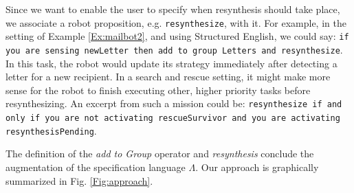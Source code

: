 Since we want to enable the user to specify when resynthesis should take place,
we associate a robot proposition, e.g. \texttt{resynthesize}, with it. 
For example, in the setting of Example \ref{Ex:mailbot2}, and using Structured English, we could say:
\texttt{if you are sensing newLetter then add to group Letters and resynthesize}. 
In this task, the robot would update its strategy immediately after detecting a letter for a new recipient. In a search and rescue setting, it might make more sense for the robot to finish executing other, higher priority tasks before resynthesizing. An excerpt from such a mission could be: \texttt{resynthesize if and only if you are not activating rescueSurvivor and you are activating resynthesisPending}.
%
%	
%	

The definition of the \emph{add to Group} operator and \emph{resynthesis} conclude the augmentation of the specification language $\Lambda$. Our approach is graphically summarized in Fig. \ref{Fig:approach}.

